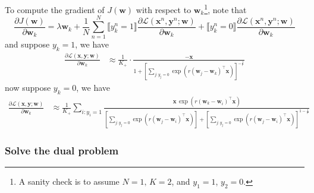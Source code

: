 \documentclass[9pt]{extarticle}
\newcommand{\llb}{\llbracket}
\newcommand{\rrb}{\rrbracket}
\newcommand{\x}{\mathbf{x}}
\newcommand{\y}{\mathbf{y}}
\newcommand{\1}{\mathbf{1}}
\newcommand{\w}{\mathbf{w}}
\newcommand{\LCal}{\mathcal{L}}
\begin{document}
To compute the gradient of $J(\w)$ with respect to $\w_k$\footnote{A sanity check is to assume $N=1, \, K=2$, and $y_1 = 1$, $y_2=0$.},
note that 
$$
\frac{\partial J(\w)} {\partial \w_k} 
= \lambda \w_k + \frac{1}{N} \sum_{n=1}^N 
  \llb y_k^n = 1 \rrb
  \frac{\partial \LCal(\x^n, \y^n; \w)} {\partial \w_k} + 
  \llb y_k^n = 0 \rrb
  \frac{\partial \LCal(\x^n, \y^n; \w)} {\partial \w_k}
$$
%
and suppose $y_k = 1$, we have
\begin{equation}
\label{eq:grad_of_loss_pos}
\begin{aligned}
\frac{\partial \LCal(\x, \y; \w)} {\partial \w_k}
&\approx \frac{1}{K_+} \cdot
         \frac{ -\x } { 1 + \left[ \underset{j:y_j=0}{\sum} \exp \left(r (\w_j - \w_k)^\top \x \right) \right]^{-\frac{1}{r}} }
\end{aligned}
\end{equation}
%
now suppose $y_k = 0$, we have
\begin{equation}
\label{eq:grad_of_loss_neg}
\begin{aligned}
\frac{\partial \LCal(\x, \y; \w)} {\partial \w_k}
&\approx \frac{1}{K_+} \sum_{i:y_i=1}
         \frac{ \x \, \exp \left( r (\w_k - \w_i)^\top \x \right) }
              { \left[ \underset{j:y_j=0}{\sum} \exp \left(r (\w_j - \w_i)^\top \x \right) \right] +
                \left[ \underset{j:y_j=0}{\sum} \exp \left(r (\w_j - \w_i)^\top \x \right) \right]^{1-\frac{1}{r}} }
\end{aligned}
\end{equation}


\subsubsection{Solve the dual problem}
\label{sssec:tp_dual}
\end{document}
